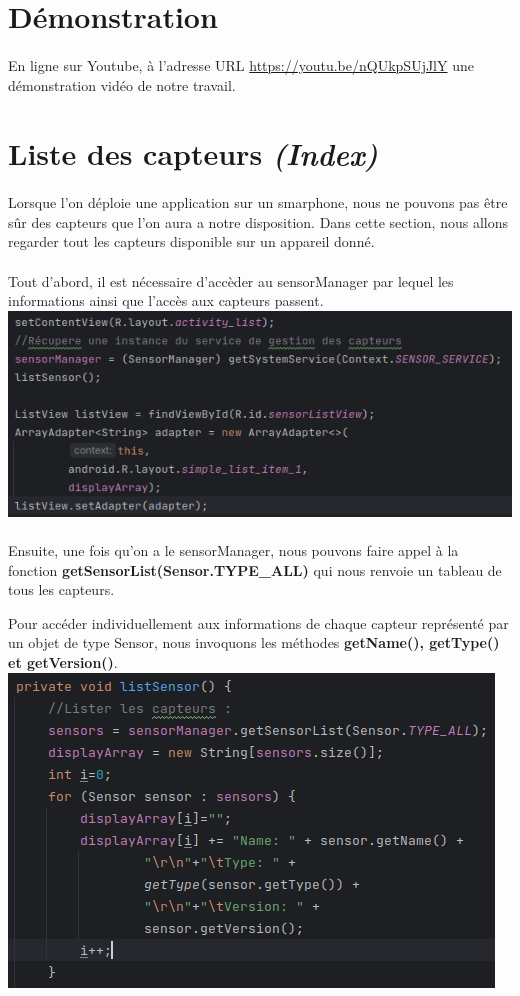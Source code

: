 \documentclass[a4paper]{article}
\begin{document}
\begin{multicols}{2}
        \section*{Démonstration}
            \paragraph{}
            En ligne sur Youtube, à l'adresse URL \url{https://youtu.be/nQUkpSUjJlY} une démonstration vidéo de notre travail.
        \section{Liste des capteurs \emph{(Index)}}
            \paragraph{}
                Lorsque l'on déploie une application sur un smarphone, nous ne pouvons pas être sûr des capteurs que l'on aura a notre disposition. Dans cette section, nous allons regarder tout les capteurs disponible sur un appareil donné.
            \paragraph{}
                Tout d'abord, il est nécessaire d'accèder au sensorManager par lequel les informations ainsi que l'accès aux capteurs passent.
                \includegraphics[width=.49\textwidth]{listeCapteur/sensorManager}
            \paragraph{}
                Ensuite, une fois qu'on a le sensorManager, nous pouvons faire appel à la fonction \textbf{getSensorList(Sensor.TYPE\_ALL)} qui nous renvoie un tableau de tous les capteurs.
                
                Pour accéder individuellement aux informations de chaque capteur représenté par un objet de type Sensor, nous invoquons les méthodes \textbf{getName(), getType() et getVersion()}.
                \noindent\includegraphics[width=.49\textwidth]{listeCapteur/listSensor}

\end{multicols}
\end{document}
